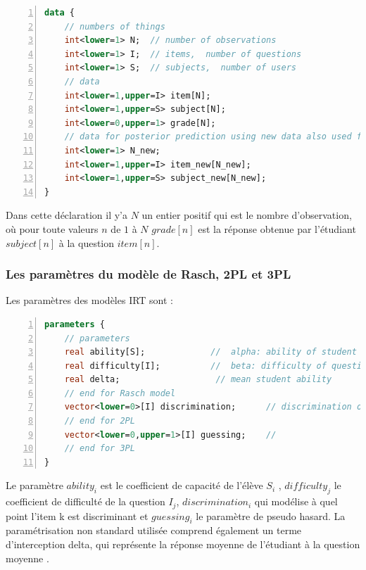 \begin{lstlisting}[language=Stan,basicstyle=\scriptsize, frame=l,framesep=4.5mm,framexleftmargin=2.5mm,tabsize=2,numbers=left,fillcolor=\color{blueforest!70},rulecolor=\color{blueforest},numberstyle=\normalfont\tiny\color{white}]
data {
	// numbers of things
	int<lower=1> N;  // number of observations
	int<lower=1> I;  // items,  number of questions  
	int<lower=1> S;  // subjects,  number of users 
	// data
	int<lower=1,upper=I> item[N];
	int<lower=1,upper=S> subject[N];
	int<lower=0,upper=1> grade[N];
	// data for posterior prediction using new data also used for Cross-validation
	int<lower=1> N_new;
	int<lower=1,upper=I> item_new[N_new];
	int<lower=1,upper=S> subject_new[N_new];
}
\end{lstlisting}
Dans cette déclaration il y’a \(\displaystyle N \) un entier positif qui est le nombre d’observation, où pour toute valeurs \(\displaystyle n \) de \(\displaystyle 1 \) à \(\displaystyle N \) \(\displaystyle grade[n] \) est la réponse obtenue par l’étudiant \(\displaystyle subject[n] \) à la question \(\displaystyle item[n] \).

\subsubsection{Les paramètres du modèle de Rasch, 2PL et 3PL}
Les paramètres des modèles IRT sont :

\begin{lstlisting}[language=Stan,basicstyle=\scriptsize, frame=l,framesep=4.5mm,framexleftmargin=2.5mm,tabsize=2,numbers=left,fillcolor=\color{blueforest!70},rulecolor=\color{blueforest},numberstyle=\normalfont\tiny\color{white}]
parameters {
	// parameters
	real ability[S];             //  alpha: ability of student
	real difficulty[I];          //  beta: difficulty of question
	real delta;                   // mean student ability
	// end for Rasch model
	vector<lower=0>[I] discrimination;      // discrimination of question
	// end for 2PL
	vector<lower=0,upper=1>[I] guessing;    //
	// end for 3PL
}
\end{lstlisting}
Le paramètre  \(\displaystyle ability_{i} \) est le coefficient de capacité de l'élève \(\displaystyle S_{i} \) , \(\displaystyle difficulty_{j} \) le coefficient de difficulté de la question \(\displaystyle I_{j} \), \(\displaystyle discrimination_{i} \) qui modélise à quel point l’item k est discriminant et \(\displaystyle guessing_{i} \) le paramètre de pseudo hasard. La paramétrisation non standard utilisée comprend également un terme d'interception delta, qui représente la réponse moyenne de l'étudiant à la question moyenne \cite{data_analysis_irt}.


